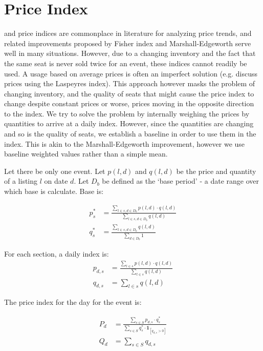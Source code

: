 \documentclass[letterpaper, 12pt]{article}
\begin{document}
\section{Price Index}\label{prm}
\cite{paasche1874preisentwicklung} and \cite{laspeyres1871ix} price indices are commonplace in literature for analyzing price trends, and related improvements proposed by Fisher index and Marshall-Edgeworth serve well in many situations. However, due to a changing inventory and the fact that the same seat is never sold twice for an event, these indices cannot readily be used. A usage based on average prices is often an imperfect solution (e.g. \cite{tremblaynfl} discuss prices using the Laspeyres index). This approach however masks the problem of changing inventory, and the quality of seats that might cause the price index to change despite constant prices or worse, prices moving in the opposite direction to the index. We try to solve the problem by internally weighing the prices by quantities to arrive at a daily index. However, since the quantities are changing and so is the quality of seats, we establish a baseline in order to use them in the index. This is akin to the Marshall-Edgeworth improvement, however we use baseline weighted values rather than a simple mean.

Let there be only one event. Let $p(l,d)$ and $q(l,d)$ be the price and quantity of a listing $l$ on date $d$. Let $D_b$ be defined as the `base period' - a date range over which base is calculate. Base is:

\begin{align*}
	p^*_s &= \frac{\sum_{l\in s, d\in D_b} p(l,d)\cdot q(l,d)}{\sum_{l\in s, d\in D_b} q(l,d)} \\
	q^*_s &= \frac{\sum_{l\in s, d\in D_b} q(l,d)}{\sum_{d\in D_b} 1} 
\end{align*}

For each section, a daily index is:
\begin{align*}
	p_{d,s} &= \frac{\sum_{l\in s} p(l,d)\cdot q(l,d)}{\sum_{l\in s} q(l,d)}\\
	q_{d,s} &= \sum_{l\in s} q(l,d)
\end{align*}

The price index for the day for the event is:

\begin{align*}
	P_d &=  \frac{\sum_{s\in S} p_{d,s}\cdot q^*_s}{\sum_{s\in S} q^*_s\cdot \pmb{1}_{[q_{d,s} > 0]} }\\
	Q_d &= \sum_{s\in S} q_{d,s}
\end{align*}
\end{document}
